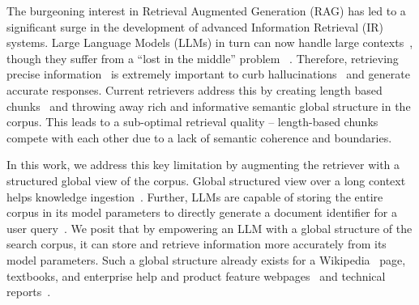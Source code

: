 The burgeoning interest in Retrieval Augmented Generation (RAG) has led to a significant surge in the development of advanced Information Retrieval (IR) systems. Large Language Models (LLMs) in turn can now handle large contexts~\cite{chen2023extending,liu2024world}, though they suffer from a ``lost in the middle'' problem ~\cite{liu-etal-2024-lost,bai2024longbench,bai2024longbench2, Li2024LongcontextLS}. Therefore, retrieving precise information~\cite{Pipitone2024LegalBenchRAGAB} is extremely important to curb hallucinations~\cite{Laban2024SummaryOA} and generate accurate responses. Current retrievers address this by creating length based chunks~\cite{Setty2024ImprovingRF} and throwing away rich and informative semantic global structure in the corpus. This leads to a sub-optimal retrieval quality -- length-based chunks compete with each other due to a lack of semantic coherence and boundaries.

In this work, we address this key limitation by augmenting the retriever with a structured global view of the corpus. Global structured view over a long context helps knowledge ingestion~\cite{liu2024structureaware}. Further, LLMs are capable of storing the entire corpus in its model parameters to directly generate a document identifier for a user query~\cite{Tay2022TransformerMA}. We posit that by empowering an LLM with a global structure of the search corpus, it can store and retrieve information more accurately from its model parameters. Such a global structure already exists for a Wikipedia~\cite{wikipedia-sample-layout} page, textbooks, and enterprise help and product feature webpages~\cite{SAP-product-documentation} and technical reports~\cite{SEC-10k-structure}.



